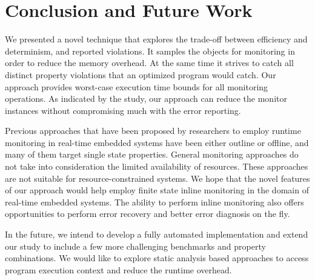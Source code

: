 \section{Conclusion and Future Work}
\label{sec:conclusion}

We presented a novel technique that explores the trade-off between efficiency 
and determinism, and reported violations. It samples the objects for monitoring 
in order to reduce the memory overhead. At the same time it strives to catch all 
distinct property violations that an optimized program would catch. Our 
approach provides worst-case execution time bounds for all monitoring 
operations.   As indicated by the study, our approach can reduce the monitor 
instances without compromising much with the error reporting.

Previous approaches that have been proposed by researchers to employ runtime 
monitoring in real-time embedded systems have been either outline or offline, 
and many of them target single state properties. General monitoring approaches 
do not take into consideration the limited availability of resources. These 
approaches are not suitable for resource-constrained systems. We hope that the 
novel features of our approach would help employ finite state inline monitoring 
in the domain of real-time embedded systems. The ability to perform inline 
monitoring also offers opportunities to perform error recovery and better error 
diagnosis on the fly.

In the future, we intend to develop a fully automated implementation and extend 
our study to include a few more challenging benchmarks and property 
combinations. We would like to explore static analysis based approaches to 
access program execution context and reduce the runtime overhead.
